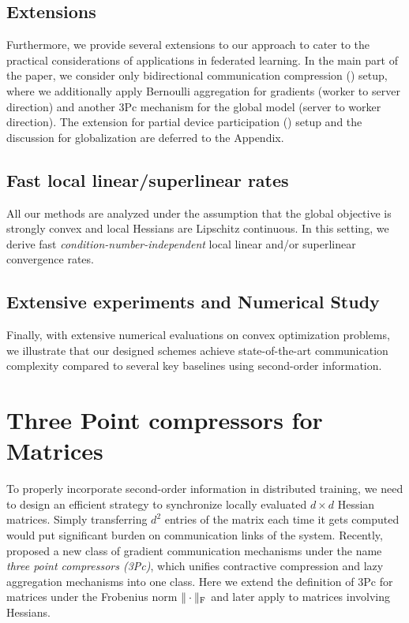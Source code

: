 \documentclass[11pt]{article}
\begin{document}
	
	\subsection{Extensions}
	Furthermore, we provide several extensions to our approach to cater to the practical considerations of applications in federated learning. In the main part of the paper, we consider only bidirectional communication compression () setup, where we additionally apply Bernoulli aggregation for gradients (worker to server direction) and another 3Pc mechanism for the global model (server to worker direction). The extension for partial device participation () setup and the discussion for globalization are deferred to the Appendix.
	
	
	\subsection{Fast local linear/superlinear rates}
	All our methods are analyzed under the assumption that the global objective is strongly convex and local Hessians are Lipschitz continuous. In this setting, we derive fast {\em condition-number-independent} local linear and/or superlinear convergence rates.
	
	
	\subsection{Extensive experiments and Numerical Study}
	Finally, with extensive numerical evaluations on convex optimization problems, we illustrate that our designed schemes achieve state-of-the-art communication complexity compared to several key baselines using second-order information.
	
	
	
	\section{Three Point compressors for Matrices}\label{sec:3Pc4M}
	
	To properly incorporate second-order information in distributed training, we need to design an efficient strategy to synchronize locally evaluated $d\times d$ Hessian matrices. Simply transferring $d^2$ entries of the matrix each time it gets computed would put significant burden on communication links of the system. Recently, \citet{richtarik3Pc} proposed a new class of gradient communication mechanisms under the name {\em three point compressors (3Pc)}, which unifies contractive compression and lazy aggregation mechanisms into one class. Here we extend the definition of 3Pc for matrices under the Frobenius norm $\|\cdot\|_{\rm F}$ and later apply to matrices involving Hessians.
	
\end{document}
